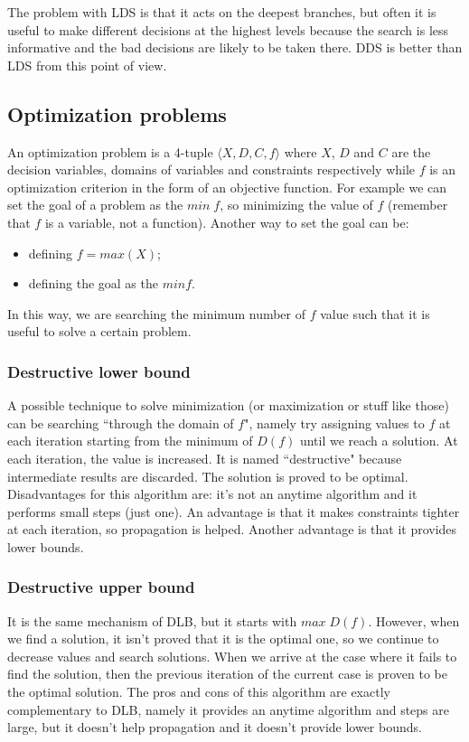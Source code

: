 \documentclass[10pt,a4paper]{article}
\begin{document}
The problem with LDS is that it acts on the deepest branches, but often it is
useful to make different decisions at the highest levels because the search is
less informative and the bad decisions are likely to be taken there. DDS is
better than LDS from this point of view.

\subsection{Optimization problems}
An optimization problem is a 4-tuple $\langle X, D, C, f \rangle$ where $X$,
$D$ and $C$ are the decision variables, domains of variables and constraints
respectively while $f$ is an optimization criterion in the form of an objective
function. For example we can set the goal of a problem as the $min \; f$, so
minimizing the value of $f$ (remember that $f$ is a variable, not a function).
Another way to set the goal can be:

\begin{itemize}
    \item defining $f = max(X)$;
    \item defining the goal as the $min f$.
\end{itemize}
In this way, we are searching the minimum number of $f$ value such that it is
useful to solve a certain problem.

\subsubsection{Destructive lower bound}
A possible technique to solve minimization (or maximization or stuff like those)
can be searching ``through the domain of $f$", namely try assigning values to $f
$ at each iteration starting from the minimum of $D(f)$ until we reach a
solution. At each iteration, the value is increased. It is named ``destructive"
because intermediate results are discarded. The solution is proved to be
optimal. Disadvantages for this algorithm are: it's not an anytime algorithm and
it performs small steps (just one). An advantage is that it makes constraints
tighter at each iteration, so propagation is helped. Another advantage is that
it provides lower bounds.

\subsubsection{Destructive upper bound}
It is the same mechanism of DLB, but it starts with $max \; D(f)$. However, when
we find a solution, it isn't proved that it is the optimal one, so we continue
to decrease values and search solutions. When we arrive at the case where it
fails to find the solution, then the previous iteration of the current case is
proven to be the optimal solution. The pros and cons of this algorithm are
exactly complementary to DLB, namely it provides an anytime algorithm and steps
are large, but it doesn't help propagation and it doesn't provide lower bounds.
\end{document}

